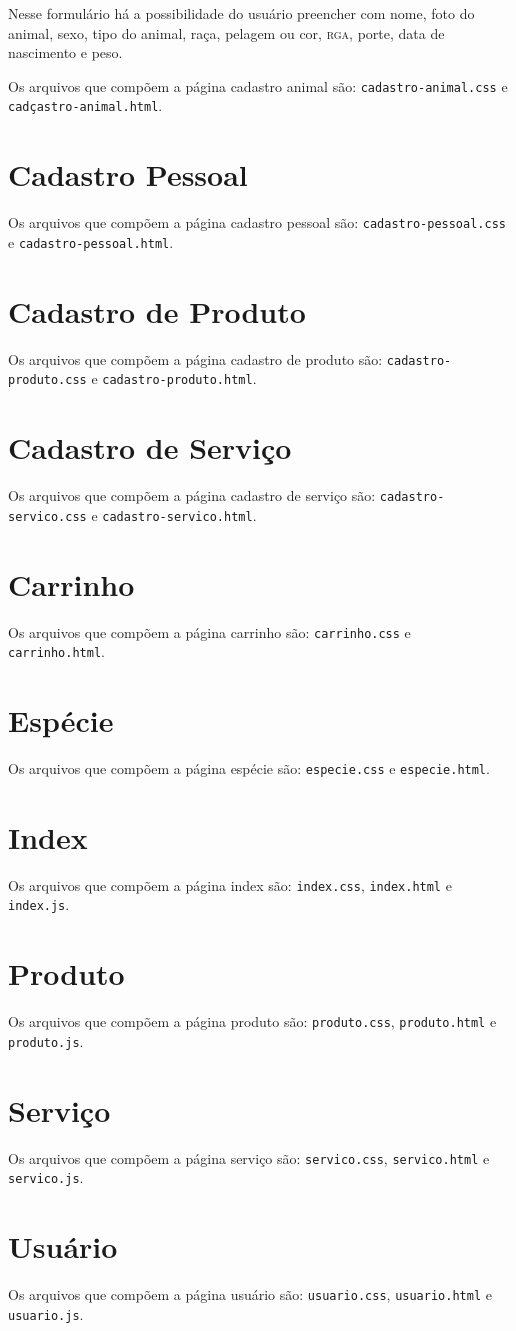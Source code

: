Nesse formulário há a possibilidade do usuário preencher com nome, foto do animal, sexo,
tipo do animal, raça, pelagem ou cor, \textsc{rga}, porte, data de nascimento e peso.

Os arquivos que compõem a página cadastro animal são: \texttt{cadastro-animal.css} e
\texttt{cadçastro-animal.html}.

\section{Cadastro Pessoal}
Os arquivos que compõem a página cadastro pessoal são: \texttt{cadastro-pessoal.css} e
\texttt{cadastro-pessoal.html}.

\section{Cadastro de Produto}
Os arquivos que compõem a página cadastro de produto são: \texttt{cadastro-produto.css} e
\texttt{cadastro-produto.html}.

\section{Cadastro de Serviço}
Os arquivos que compõem a página cadastro de serviço são: \texttt{cadastro-servico.css} e
\texttt{cadastro-servico.html}.

\section{Carrinho}
Os arquivos que compõem a página carrinho são: \texttt{carrinho.css} e \texttt{carrinho.html}.

\section{Espécie}
Os arquivos que compõem a página espécie são: \texttt{especie.css} e \texttt{especie.html}.

\section{Index}
Os arquivos que compõem a página index são: \texttt{index.css}, \texttt{index.html} e
\texttt{index.js}.

\section{Produto}
Os arquivos que compõem a página produto são: \texttt{produto.css}, \texttt{produto.html} e
\texttt{produto.js}.

\section{Serviço}
Os arquivos que compõem a página serviço são: \texttt{servico.css}, \texttt{servico.html} e
\texttt{servico.js}.

\section{Usuário}
Os arquivos que compõem a página usuário são: \texttt{usuario.css}, \texttt{usuario.html} e
\texttt{usuario.js}.
